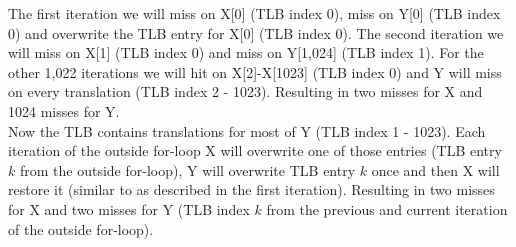 \documentclass[a4paper, 11pt]{exam}
\begin{document}
\begin{enumerate}
The first iteration we will miss on X[0] (TLB index 0), miss on Y[0] (TLB index 0) and overwrite the TLB entry for X[0] (TLB index 0). The second iteration we will miss on X[1] (TLB index 0) and miss on Y[1,024] (TLB index 1). For the other 1,022 iterations we will hit on X[2]-X[1023] (TLB index 0) and Y will miss on every translation (TLB index 2 - 1023). Resulting in two misses for X and 1024 misses for Y. \\

Now the TLB contains translations for most of Y (TLB index 1 - 1023). Each iteration of the outside for-loop X will overwrite one of those entries (TLB entry $k$ from the outside for-loop), Y will overwrite TLB entry $k$ once and then X will restore it (similar to as described in the first iteration). Resulting in two misses for X and two misses for Y (TLB index $k$ from the previous and current iteration of the outside for-loop). \\


\end{enumerate}
\end{document}
